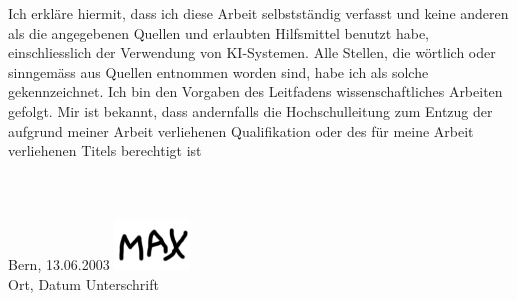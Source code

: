 \thispagestyle{empty}
\noindent
Ich erkläre hiermit, dass ich diese Arbeit selbstständig verfasst und keine anderen als die angegebenen Quellen und erlaubten Hilfsmittel benutzt habe, einschliesslich der Verwendung von KI-Systemen. Alle Stellen, die wörtlich oder sinngemäss aus Quellen entnommen worden sind, habe ich als solche gekennzeichnet. Ich bin den Vorgaben des Leitfadens wissenschaftliches Arbeiten gefolgt. Mir ist bekannt, dass andernfalls die Hochschulleitung zum Entzug der aufgrund meiner Arbeit verliehenen Qualifikation oder des für meine Arbeit verliehenen Titels berechtigt ist\\
\\
\\
\\
Bern, 13.06.2003 \hfill \includegraphics[width=2cm]{content/00_assets/unterschrift.png}\\
Ort, Datum \hfill Unterschrift \autorenschaft